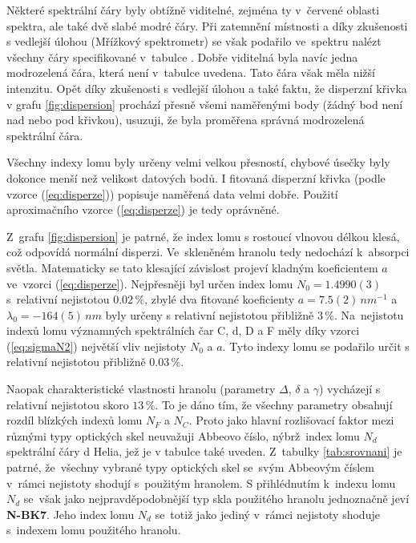 \documentclass{../concepts/titul_protokol_p/prepareprotokol} %
\begin{document}
Některé spektrální čáry byly obtížně viditelné, zejména ty v~červené
oblasti spektra, ale také dvě slabé modré čáry. Při zatemnění místnosti
a díky zkušenosti s vedlejší úlohou (Mřížkový spektrometr) se však
podařilo ve~spektru nalézt všechny čáry specifikované v~tabulce
\cite{tabulka}. Dobře viditelná byla navíc jedna modrozelená čára,
která není v~tabulce uvedena. Tato čára však měla nižší intenzitu.
Opět díky zkušenosti s vedlejší úlohou a také faktu, že disperzní
křivka v grafu \ref{fig:dispersion} prochází přesně všemi naměřenými body
(žádný bod není nad nebo pod křivkou), usuzuji, že byla proměřena
správná modrozelená spektrální čára.

Všechny indexy lomu byly určeny velmi velkou přesností, chybové úsečky
byly dokonce menší než velikost datových bodů. I fitovaná disperzní
křivka (podle vzorce (\ref{eq:disperze})) popisuje naměřená data
velmi dobře. Použití aproximačního vzorce (\ref{eq:disperze}) je
tedy oprávněné.

Z~grafu \ref{fig:dispersion} je patrné, že index lomu
s rostoucí vlnovou délkou klesá, což odpovídá normální disperzi.
Ve~skleněném hranolu tedy nedochází k~absorpci světla. Matematicky
se tato klesající závislost projeví kladným koeficientem $a$ ve~vzorci
(\ref{eq:disperze}). Nejpřesněji byl určen index lomu $N_0 = 1.4990(3)$
s~relativní nejistotou $0.02\,\%$, zbylé dva fitované koeficienty 
$a = 7.5(2)\,\unit{nm^{-1}}$ a $\lambda_0 = -164(5)\,\unit{nm}$ byly
určeny s relativní nejistotou přibližně $3\,\%$. Na~nejistotu 
indexů lomu významných spektrálních čar C, d, D a F měly díky vzorci
(\ref{eq:sigmaN2}) největší vliv nejistoty $N_0$ a $a$. Tyto indexy
lomu se podařilo určit s relativní nejistotou přibližně $0.03\,\%$.

Naopak charakteristické vlastnosti hranolu (parametry $\Delta$, 
$\delta$ a $\gamma$) vycházejí s relativní nejistotou skoro $13\,\%$.
To je dáno tím, že všechny parametry obsahují rozdíl blízkých indexů
lomu $N_F$ a $N_C$. Proto jako hlavní rozlišovací faktor 
mezi různými typy optických skel neuvažuji Abbeovo číslo,
nýbrž~index lomu $N_d$ spektrální čáry d Helia, jež je v tabulce \cite{edmund}
také uveden. Z~tabulky \ref{tab:srovnani} je patrné, že~všechny
vybrané typy optických skel se~svým Abbeovým číslem v~rámci nejistoty
shodují s~použitým hranolem. S přihlédnutím k~indexu lomu $N_d$
se~však jako nejpravděpodobnější typ skla použitého hranolu
jednoznačně jeví \textbf{N-BK7}. Jeho index lomu $N_d$ se~totiž
jako jediný v~rámci nejistoty shoduje s~indexem lomu použitého hranolu.
\end{document}
